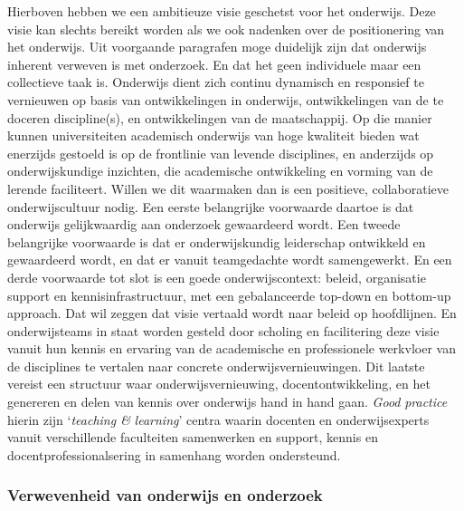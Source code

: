 \documentclass[smallauthor, chapterhaspagenum, nochapterinheader, pagenuminheader,  bigchapnum,medium2, tocpages, garamond, titleinheader]{jote-book}
\begin{document}
	Hierboven hebben we een ambitieuze visie geschetst voor het onderwijs. Deze visie kan slechts bereikt worden als we ook nadenken over de positionering van het onderwijs. Uit voorgaande paragrafen moge duidelijk zijn dat onderwijs inherent verweven is met onderzoek. En dat het geen individuele maar een collectieve taak is. Onderwijs dient zich continu dynamisch en responsief te vernieuwen op basis van ontwikkelingen in onderwijs, ontwikkelingen van de te doceren discipline(s), en ontwikkelingen van de maatschappij. Op die manier kunnen universiteiten academisch onderwijs van hoge kwaliteit bieden wat enerzijds gestoeld is op de frontlinie van levende disciplines, en anderzijds op onderwijskundige inzichten, die academische ontwikkeling en vorming van de lerende faciliteert. Willen we dit waarmaken dan is een positieve, collaboratieve onderwijscultuur nodig. Een eerste belangrijke voorwaarde daartoe is dat onderwijs gelijkwaardig aan onderzoek gewaardeerd wordt. Een tweede belangrijke voorwaarde is dat er onderwijskundig leiderschap ontwikkeld en gewaardeerd wordt, en dat er vanuit teamgedachte wordt samengewerkt. En een derde voorwaarde tot slot is een goede onderwijscontext: beleid, organisatie support en kennisinfrastructuur, met een gebalanceerde top-down en bottom-up approach. Dat wil zeggen dat visie vertaald wordt naar beleid op hoofdlijnen. En onderwijsteams in staat worden gesteld door scholing en facilitering deze visie vanuit hun kennis en ervaring van de academische en professionele werkvloer van de disciplines te vertalen naar concrete onderwijsvernieuwingen. Dit laatste vereist een structuur waar onderwijsvernieuwing, docentontwikkeling, en het genereren en delen van kennis over onderwijs hand in hand gaan. \emph{Good}\emph{ }\emph{practice} hierin zijn ‘\emph{teaching \& }\emph{learning}' centra waarin docenten en onderwijsexperts vanuit verschillende faculteiten samenwerken en support, kennis en docentprofessionalsering in samenhang worden ondersteund.



	\subsubsection{Verwevenheid van onderwijs en onderzoek}
\end{document}
